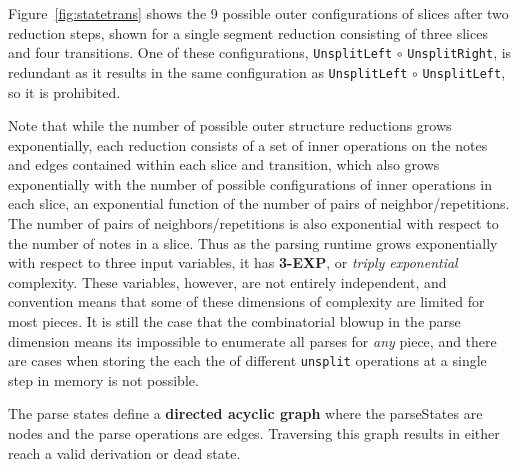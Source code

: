 \documentclass[12pt,a4paper,twoside,openany]{report} \usepackage[pdfborder={0 0 0}]{hyperref}    %
\theoremstyle{definition} \newtheorem{definition}{Definition}[section]
\begin{document}

    Figure~\ref{fig:statetrans} shows the 9 possible outer configurations of slices after two reduction steps, shown for
    a single segment reduction consisting of three slices and four transitions. One of these configurations,
    \texttt{UnsplitLeft} $\circ$ \texttt{UnsplitRight}, is redundant as it results in the same configuration as
    \texttt{UnsplitLeft} $\circ$ \texttt{UnsplitLeft}, so it is prohibited.

    Note that while the number of possible outer structure reductions grows exponentially, each reduction consists of
    a set of inner operations on the notes and edges contained within each slice and transition, which also grows
    exponentially with the number of possible configurations of inner operations in each slice, an exponential function
    of the number of pairs of neighbor/repetitions. The number of pairs of neighbors/repetitions is also exponential
    with respect to the number of notes in a slice. Thus as the parsing runtime grows exponentially with respect to
    three input variables, it has \textbf{3-EXP}, or \textit{triply exponential} complexity. These variables, however,
    are not entirely independent, and convention means that some of these dimensions of complexity are limited for most
    pieces. It is still the case that the combinatorial blowup in the parse dimension means its impossible to enumerate
    all parses for \textit{any} piece, and there are cases when storing the each the of different \texttt{unsplit}
    operations at a single step in memory is not possible.

    The parse states define a \textbf{directed acyclic graph} where the parseStates are nodes and the parse operations
    are edges. Traversing this graph results in either reach a valid derivation or dead state. 


\end{document}
